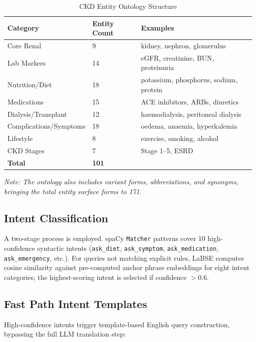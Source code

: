 \documentclass[12pt,a4paper]{report}
\begin{document}
\begin{table}[H]
\centering
\caption{CKD Entity Ontology Structure}
\label{tab:ontology}
\renewcommand{\arraystretch}{1.3}
\begin{tabularx}{\textwidth}{@{}Xll@{}}
\toprule
\textbf{Category} & \textbf{Entity Count} & \textbf{Examples} \\
\midrule
Core Renal & 9 & kidney, nephron, glomerulus \\
Lab Markers & 14 & eGFR, creatinine, BUN, proteinuria \\
Nutrition/Diet & 18 & potassium, phosphorus, sodium, protein \\
Medications & 15 & ACE inhibitors, ARBs, diuretics \\
Dialysis/Transplant & 12 & haemodialysis, peritoneal dialysis \\
Complications/Symptoms & 18 & oedema, anaemia, hyperkalemia \\
Lifestyle & 8 & exercise, smoking, alcohol \\
CKD Stages & 7 & Stage 1--5, ESRD \\
\midrule
\textbf{Total} & \textbf{101} & \\
\bottomrule
\end{tabularx}
\end{table}

\textit{Note: The ontology also includes variant forms, abbreviations, and synonyms, bringing the total entity surface forms to 171.}

\subsection{Intent Classification}

A two-stage process is employed. spaCy \texttt{Matcher} patterns cover 10 high-confidence syntactic intents (\texttt{ask\_diet}, \texttt{ask\_symptom}, \texttt{ask\_medication}, \texttt{ask\_emergency}, etc.). For queries not matching explicit rules, LaBSE computes cosine similarity against pre-computed anchor phrase embeddings for eight intent categories; the highest-scoring intent is selected if confidence $>0.6$.

\subsection{Fast Path Intent Templates}

High-confidence intents trigger template-based English query construction, bypassing the full LLM translation step:
\end{document}
